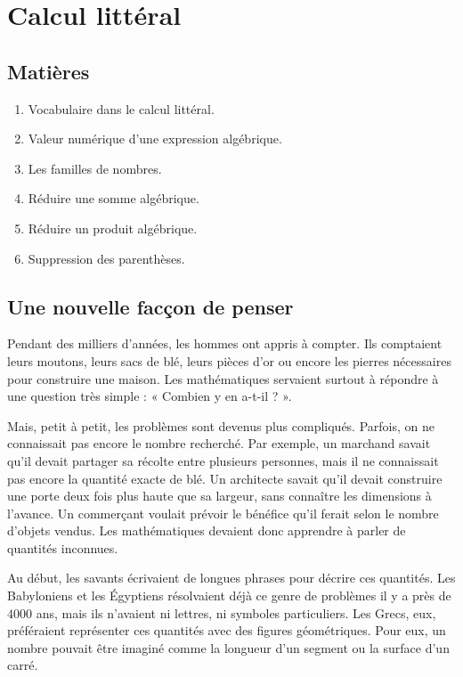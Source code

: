 \documentclass[../../syllabus_1.tex]{subfiles}
\begin{document}
\chapter{Calcul littéral}


\section*{Matières}
\begin{enumerate}[label=\textbf{\arabic*.}]
    \item Vocabulaire dans le calcul littéral.
    \item Valeur numérique d'une expression algébrique.
    \item Les familles de nombres.
    \item Réduire une somme algébrique.
    \item Réduire un produit algébrique.
    \item Suppression des parenthèses.
\end{enumerate}

\section{Une nouvelle facçon de penser}
Pendant des milliers d'années, les hommes ont appris à compter. Ils comptaient leurs moutons, leurs sacs de blé, leurs pièces d'or ou encore les pierres nécessaires pour construire une maison. Les mathématiques servaient surtout à répondre à une question très simple :
« Combien y en a-t-il ? ».

Mais, petit à petit, les problèmes sont devenus plus compliqués. Parfois, on ne connaissait pas encore le nombre recherché. Par exemple, un marchand savait qu'il devait partager sa récolte entre plusieurs personnes, mais il ne connaissait pas encore la quantité exacte de blé. Un architecte savait qu'il devait construire une porte deux fois plus haute que sa largeur, sans connaître les dimensions à l'avance. Un commerçant voulait prévoir le bénéfice qu'il ferait selon le nombre d'objets vendus. Les mathématiques devaient donc apprendre à parler de quantités inconnues.

Au début, les savants écrivaient de longues phrases pour décrire ces quantités. Les Babyloniens et les Égyptiens résolvaient déjà ce genre de problèmes il y a près de $4 000$ ans, mais ils n'avaient ni lettres, ni symboles particuliers.
Les Grecs, eux, préféraient représenter ces quantités avec des figures géométriques. Pour eux, un nombre pouvait être imaginé comme la longueur d'un segment ou la surface d'un carré.
\end{document}
